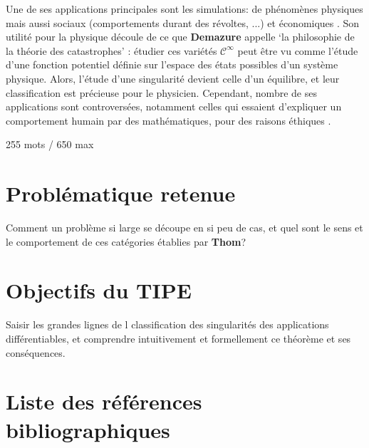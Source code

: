 \documentclass{article}
\begin{document}
Une de ses applications principales sont les simulations: de phénomènes physiques mais aussi sociaux (comportements durant des révoltes, ...) et économiques \cite{bbcvid} \cite{poston}.
Son utilité pour la physique découle de ce que \textbf{Demazure} appelle `la philosophie de la théorie des catastrophes' \cite{demazure}: étudier ces variétés $\mathcal{C}^\infty$ peut être vu comme l'étude d'une fonction potentiel définie sur l'espace des états possibles d'un système physique.
Alors, l'étude d'une singularité devient celle d'un équilibre, et leur classification est précieuse pour le physicien.
Cependant, nombre de ses applications sont controversées, notamment celles qui essaient d'expliquer un comportement humain par des mathématiques, pour des raisons éthiques \cite{wikipedia}.

\bigskip

\small{255 mots / 650 max}

\section{Problématique retenue}

Comment un problème si large se découpe en si peu de cas, et quel sont le sens et le comportement de ces catégories établies par \textbf{Thom}?

\section{Objectifs du TIPE}

Saisir les grandes lignes de l classification des singularités des applications différentiables, et comprendre intuitivement et formellement ce théorème et ses conséquences.

\section{Liste des références bibliographiques}



\end{document}
